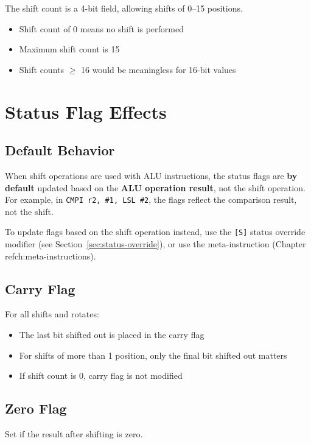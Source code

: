 The shift count is a 4-bit field, allowing shifts of 0--15 positions.

\begin{itemize}
	\item Shift count of 0 means no shift is performed
	\item Maximum shift count is 15
	\item Shift counts $\geq$ 16 would be meaningless for 16-bit values
\end{itemize}

\section{Status Flag Effects}

\subsection{Default Behavior}

When shift operations are used with ALU instructions, the status flags are \textbf{by default} updated based on the
\textbf{ALU operation result}, not the shift operation. For example, in \texttt{CMPI r2, \#1, LSL \#2}, the flags
reflect the comparison result, not the shift.

To update flags based on the shift operation instead, use the \texttt{[S]} status override modifier (see
Section~\ref{sec:status-override}), or use the  meta-instruction (Chapter~\\ref{ch:meta-instructions}).

\subsection{Carry Flag}

For all shifts and rotates:
\begin{itemize}
	\item The last bit shifted out is placed in the carry flag
	\item For shifts of more than 1 position, only the final bit shifted out matters
	\item If shift count is 0, carry flag is not modified
\end{itemize}

\subsection{Zero Flag}

Set if the result after shifting is zero.


